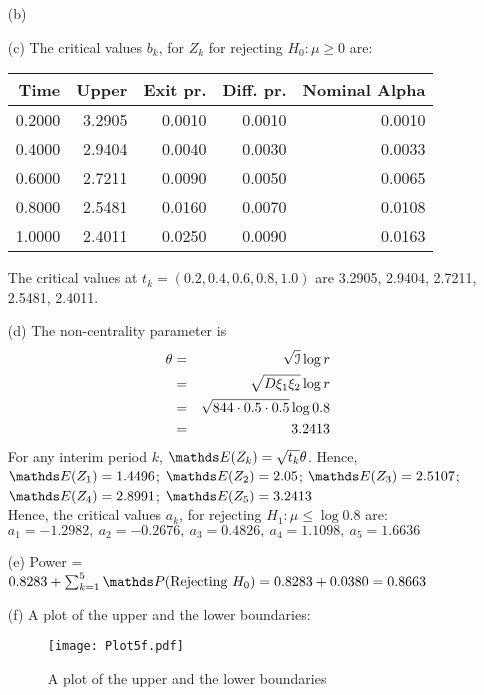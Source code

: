 \documentclass[11pt,a4paper]{article}
\begin{document}
\begin{enumerate}
\begin{enumerate}
\item[(b)] 
\item[(c)] The critical values $b_k$, for $Z_k$ for rejecting $H_0: \mu \geq 0$ are:
\begin{table}[H]
\centering
\begin{tabular}{rrrrr}
  \hline
  Time &  Upper & Exit pr. & Diff. pr. & Nominal Alpha \\ 
  \hline
  0.2000 & 3.2905 & 0.0010 & 0.0010 & 0.0010 \\ 
  0.4000 & 2.9404 & 0.0040 & 0.0030 & 0.0033 \\ 
  0.6000 & 2.7211 & 0.0090 & 0.0050 & 0.0065 \\ 
  0.8000 & 2.5481 & 0.0160 & 0.0070 & 0.0108 \\ 
  1.0000 & 2.4011 & 0.0250 & 0.0090 & 0.0163 \\ 
  \hline
\end{tabular}
\end{table}
The critical values at $t_k = (0.2, 0.4, 0.6, 0.8, 1.0)$ are 3.2905, 2.9404, 2.7211, 2.5481, 2.4011.

\item[(d)] The non-centrality parameter is
\begin{eqnarray*}
 \theta & = & \sqrt{\mathcal{I}}\log r \\
        & = & \sqrt{D \xi_1 \xi_2} \log r \\
        & = & \sqrt{844 \cdot 0.5 \cdot 0.5 } \log 0.8 \\
        & = & 3.2413
\end{eqnarray*}
For any interim period $k$, $\Exp(Z_k) = \sqrt{t_k}\theta$. Hence,\\
$\Exp(Z_1) = 1.4496$; 
$\Exp(Z_2) = 2.05$; 
$\Exp(Z_3) = 2.5107$; 
$\Exp(Z_4) = 2.8991$; 
$\Exp(Z_5) = 3.2413$ \\
Hence, the critical values $a_k$, for rejecting $H_1: \mu \leq \log 0.8$ are:\\
$a_1 = -1.2982,\ a_2 = -0.2676,\ a_3 = 0.4826,\ a_4 = 1.1098,\ a_5 = 1.6636$     

\item[(e)] Power = $0.8283 + \sum_{k = 1}^5 \Prob(\text{Rejecting } H_0) = 0.8283 + 0.0380 = 0.8663$

\item[(f)] A plot of the upper and the lower boundaries:
\begin{figure}[H]
\begin{center}
\texttt{[image: Plot5f.pdf]}
\end{center}
\caption{A plot of the upper and the lower boundaries}
\end{figure}


\end{enumerate}
\end{enumerate}
\end{document}
